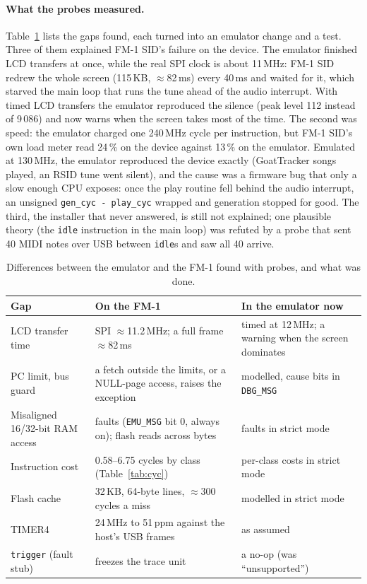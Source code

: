 \documentclass[10pt,a4paper]{article}
\newcommand{\code}[1]{\texttt{#1}}
\begin{document}
\paragraph{What the probes measured.} Table~\ref{tab:hw} lists the gaps found, each turned into an
emulator change and a test. Three of them explained FM-1 SID's failure on the device. The emulator
finished LCD transfers at once, while the real SPI clock is about 11\,MHz: FM-1 SID redrew the whole
screen (115\,KB, $\approx$82\,ms) every 40\,ms and waited for it, which starved the main loop that
runs the tune ahead of the audio interrupt. With timed LCD transfers the emulator reproduced the
silence (peak level 112 instead of 9\,086) and now warns when the screen takes most of the time.
The second was speed: the emulator charged one 240\,MHz cycle per instruction, but FM-1 SID's own
load meter read 24\,\% on the device against 13\,\% on the emulator. Emulated at 130\,MHz, the
emulator reproduced the device exactly (GoatTracker songs played, an RSID tune went silent), and
the cause was a firmware bug that only a slow enough CPU exposes: once the play routine fell behind
the audio interrupt, an unsigned \code{gen\_cyc - play\_cyc} wrapped and generation stopped for
good. The third, the installer that never answered, is still not explained; one plausible theory
(the \code{idle} instruction in the main loop) was refuted by a probe that sent 40 MIDI notes over
USB between \code{idle}s and saw all 40 arrive.

\begin{table}[t]
\centering\footnotesize
\begin{tabularx}{\textwidth}{@{}>{\raggedright}p{36mm}X>{\raggedright\arraybackslash}p{36mm}@{}}
\toprule
Gap & On the FM-1 & In the emulator now\\
\midrule
LCD transfer time & SPI $\approx$11.2\,MHz; a full frame $\approx$82\,ms & timed at 12\,MHz; a warning when the screen dominates\\
PC limit, bus guard & a fetch outside the limits, or a NULL-page access, raises the exception & modelled, cause bits in \code{DBG\_MSG}\\
Misaligned 16/32-bit RAM access & faults (\code{EMU\_MSG} bit 0, always on); flash reads across bytes & faults in strict mode\\
Instruction cost & 0.58--6.75 cycles by class (Table~\ref{tab:cyc}) & per-class costs in strict mode\\
Flash cache & 32\,KB, 64-byte lines, $\approx$300 cycles a miss & modelled in strict mode\\
TIMER4 & 24\,MHz to 51\,ppm against the host's USB frames & as assumed\\
\code{trigger} (fault stub) & freezes the trace unit & a no-op (was ``unsupported'')\\
\bottomrule
\end{tabularx}
\caption{Differences between the emulator and the FM-1 found with probes, and what was done.}
\label{tab:hw}
\end{table}
\end{document}

